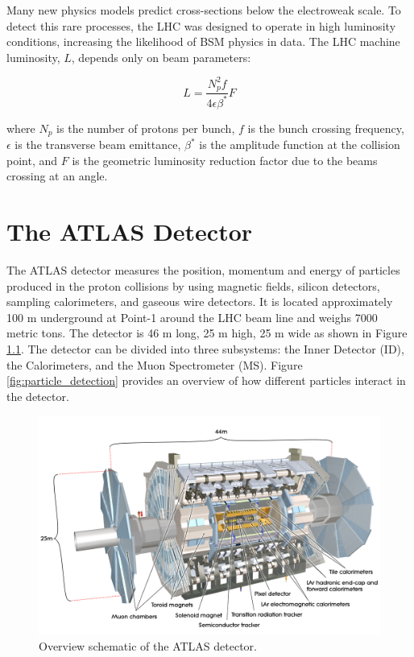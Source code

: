 Many new physics models predict cross-sections below the electroweak scale. To detect this rare processes, the LHC was designed to operate in high luminosity conditions, increasing the likelihood of BSM physics in data. The LHC machine luminosity, $L$, depends only on beam parameters:

\begin{equation}
L=\frac{N_{p}^{2}f}{4\epsilon\beta^{*}}F
\end{equation}

where $N_{p}$ is the number of protons per bunch, $f$ is the bunch crossing frequency, $\epsilon$ is the transverse beam emittance, $\beta^{*}$ is the amplitude function at the collision point, and $F$ is the geometric luminosity reduction factor due to the beams crossing at an angle.

\chapter{The ATLAS Detector}
The ATLAS detector measures the position, momentum and energy of particles produced in the proton collisions by using magnetic fields, silicon detectors, sampling calorimeters, and gaseous wire detectors. It is located approximately 100 m underground at Point-1 around the LHC beam line and weighs 7000 metric tons. The detector is 46 m long, 25 m high, 25 m wide  as shown in Figure \ref{fig:atlas_detectors}. The detector can be divided into three subsystems: the Inner Detector (ID), the Calorimeters, and the Muon Spectrometer (MS). Figure \ref{fig:particle_detection} provides an overview of how different particles interact in the detector.
\begin{figure}[h!]
  \centering
  \includegraphics[width=\hsize]{figures/Detector/atlas.jpg}
  \caption{Overview schematic of the ATLAS detector.} 
  \label{fig:atlas_detectors}
\end{figure}
\FloatBarrier


